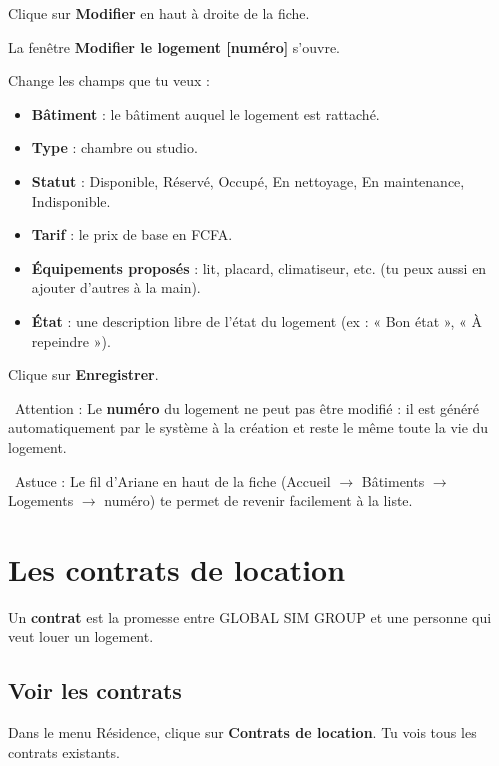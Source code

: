 \documentclass[12pt,a4paper]{article}
\newcommand{\attention}[1]{\par\noindent\textcolor{warn}{\faExclamationTriangle\ Attention : #1}\par}
\newcommand{\astuce}[1]{\par\noindent\textcolor{success}{\faLightbulb\ Astuce : #1}\par}
\begin{document}
\begin{etapes}
  \item Clique sur \textbf{Modifier} en haut à droite de la fiche.
  \item La fenêtre \textbf{Modifier le logement [numéro]} s'ouvre.
  \item Change les champs que tu veux :
  \begin{itemize}
    \item \textbf{Bâtiment} : le bâtiment auquel le logement est rattaché.
    \item \textbf{Type} : chambre ou studio.
    \item \textbf{Statut} : Disponible, Réservé, Occupé, En nettoyage, En maintenance, Indisponible.
    \item \textbf{Tarif} : le prix de base en FCFA.
    \item \textbf{Équipements proposés} : lit, placard, climatiseur, etc. (tu peux aussi en ajouter d'autres à la main).
    \item \textbf{État} : une description libre de l'état du logement (ex : « Bon état », « À repeindre »).
  \end{itemize}
  \item Clique sur \textbf{Enregistrer}.
\end{etapes}

\attention{Le \textbf{numéro} du logement ne peut pas être modifié : il est généré automatiquement par le système à la création et reste le même toute la vie du logement.}

\astuce{Le fil d'Ariane en haut de la fiche (Accueil $\rightarrow$ Bâtiments $\rightarrow$ Logements $\rightarrow$ numéro) te permet de revenir facilement à la liste.}

\newpage

\section{Les contrats de location}

Un \textbf{contrat} est la promesse entre GLOBAL SIM GROUP et une personne qui veut louer un logement.

\subsection{Voir les contrats}

Dans le menu Résidence, clique sur \textbf{Contrats de location}. Tu vois tous les contrats existants.
\end{document}
